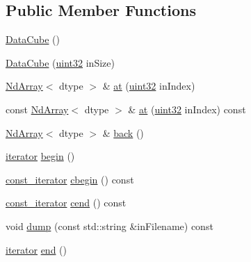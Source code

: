 \subsection*{Public Member Functions}
\begin{DoxyCompactItemize}
\item 
\mbox{\hyperlink{class_num_cpp_1_1_data_cube_a2be1915c2d9da633b802579690b7cc29}{Data\+Cube}} ()
\item 
\mbox{\hyperlink{class_num_cpp_1_1_data_cube_ad8f5801b4c2c7b4ce6e69fcb7d412c0d}{Data\+Cube}} (\mbox{\hyperlink{namespace_num_cpp_a36f388e948380413c63011cab9b7fbd5}{uint32}} in\+Size)
\item 
\mbox{\hyperlink{class_num_cpp_1_1_nd_array}{Nd\+Array}}$<$ dtype $>$ \& \mbox{\hyperlink{class_num_cpp_1_1_data_cube_ac4ba93c6bff1a954b8ab73b2b671fc82}{at}} (\mbox{\hyperlink{namespace_num_cpp_a36f388e948380413c63011cab9b7fbd5}{uint32}} in\+Index)
\item 
const \mbox{\hyperlink{class_num_cpp_1_1_nd_array}{Nd\+Array}}$<$ dtype $>$ \& \mbox{\hyperlink{class_num_cpp_1_1_data_cube_a4671cf664bf22da2397a60eed58441c2}{at}} (\mbox{\hyperlink{namespace_num_cpp_a36f388e948380413c63011cab9b7fbd5}{uint32}} in\+Index) const
\item 
\mbox{\hyperlink{class_num_cpp_1_1_nd_array}{Nd\+Array}}$<$ dtype $>$ \& \mbox{\hyperlink{class_num_cpp_1_1_data_cube_a856a49c18f35b0527e3aab14fceb6bd9}{back}} ()
\item 
\mbox{\hyperlink{class_num_cpp_1_1_data_cube_a817f739957d3d426e8a19a66867674ba}{iterator}} \mbox{\hyperlink{class_num_cpp_1_1_data_cube_acbce5c780a3d66e6db255e87d2b8b918}{begin}} ()
\item 
\mbox{\hyperlink{class_num_cpp_1_1_data_cube_a5916086d9b71149eaa35651e2212de39}{const\+\_\+iterator}} \mbox{\hyperlink{class_num_cpp_1_1_data_cube_a76fa1b7818251391a9a240098557fb68}{cbegin}} () const
\item 
\mbox{\hyperlink{class_num_cpp_1_1_data_cube_a5916086d9b71149eaa35651e2212de39}{const\+\_\+iterator}} \mbox{\hyperlink{class_num_cpp_1_1_data_cube_a882f0475646eb1381969fd6f6ff054cf}{cend}} () const
\item 
void \mbox{\hyperlink{class_num_cpp_1_1_data_cube_af4f3bcc885d1a0668e202d163d31d1ac}{dump}} (const std\+::string \&in\+Filename) const
\item 
\mbox{\hyperlink{class_num_cpp_1_1_data_cube_a817f739957d3d426e8a19a66867674ba}{iterator}} \mbox{\hyperlink{class_num_cpp_1_1_data_cube_a8664c89b7134dcc64d9eb0d9c9f3f8c1}{end}} ()
\item 

\end{DoxyCompactItemize}
